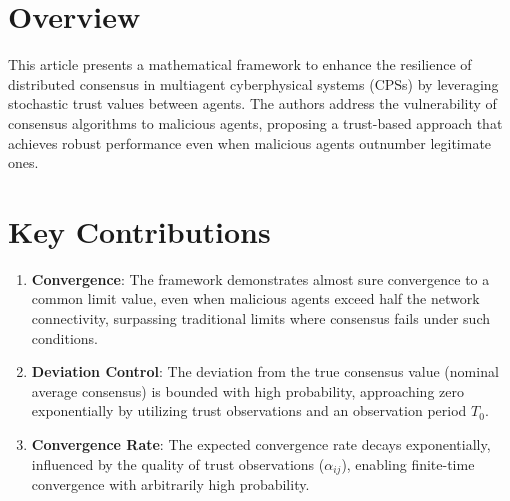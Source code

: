 \documentclass{article}
\begin{document}
\section*{Overview}
This article presents a mathematical framework to enhance the resilience of distributed consensus in multiagent cyberphysical systems (CPSs) by leveraging stochastic trust values between agents. The authors address the vulnerability of consensus algorithms to malicious agents, proposing a trust-based approach that achieves robust performance even when malicious agents outnumber legitimate ones.

\section*{Key Contributions}
\begin{enumerate}
    \item \textbf{Convergence}: The framework demonstrates almost sure convergence to a common limit value, even when malicious agents exceed half the network connectivity, surpassing traditional limits where consensus fails under such conditions.
    \item \textbf{Deviation Control}: The deviation from the true consensus value (nominal average consensus) is bounded with high probability, approaching zero exponentially by utilizing trust observations and an observation period $T_0$.
    \item \textbf{Convergence Rate}: The expected convergence rate decays exponentially, influenced by the quality of trust observations ($\alpha_{ij}$), enabling finite-time convergence with arbitrarily high probability.
\end{enumerate}
\end{document}
